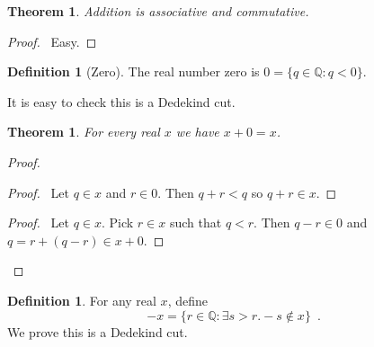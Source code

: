\documentclass{article}
\let\qed\relax
\newtheorem{theorem}[axiom]{Theorem}
\theoremstyle{definition}
\newtheorem{definition}[axiom]{Definition}
\begin{document}
    \begin{theorem}
        Addition is associative and commutative.
    \end{theorem}

    \begin{proof}
        \pf\ Easy. \qed
    \end{proof}

    \begin{definition}[Zero]
        The real number zero is $0 = \{ q \in \mathbb{Q} : q < 0 \}$.

        It is easy to check this is a Dedekind cut.
    \end{definition}

    \begin{theorem}
        For every real $x$ we have $x + 0 = x$.
    \end{theorem}

    \begin{proof}
        \pf
        \begin{proof}
            \pf\ Let $q \in x$ and $r \in 0$. Then $q + r < q$ so $q + r \in x$.
        \end{proof}
        \begin{proof}
            \pf\ Let $q \in x$. Pick $r \in x$ such that $q < r$. Then $q - r \in 0$ and $q = r + (q-r) \in
            x + 0$.
        \end{proof}
        \qed
    \end{proof}

    \begin{definition}
        For any real $x$, define
        \[ - x = \{ r \in \mathbb{Q} : \exists s > r. -s \notin x \} \enspace . \]
        We prove this is a Dedekind cut.
    \end{definition}
\end{document}
